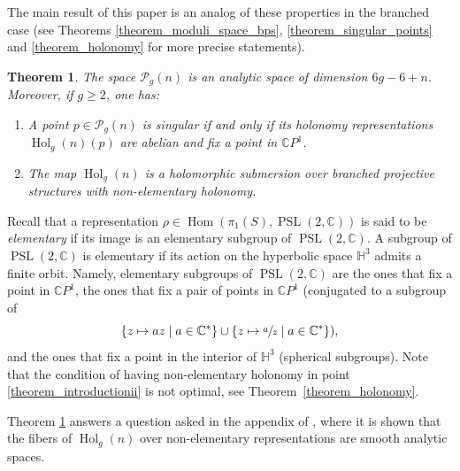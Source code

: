 \documentclass[10pt]{amsart}
\newcommand{\C}{\mathbb C}
\newcommand{\CP}{\mathbb CP}
\DeclareMathOperator{\Hol}{Hol}
\DeclareMathOperator{\Hom}{Hom}
\DeclareMathOperator{\PSL}{PSL}
\theoremstyle{definition}
\theoremstyle{plain}
\newtheorem{theoremx}{Theorem}
\begin{document}
The main result of this paper is an analog of these properties in the branched case (see Theorems \ref{theorem_moduli_space_bps}, \ref{theorem_singular_points} and \ref{theorem_holonomy} for more precise statements).

\begin{theoremx}\label{theorem_introduction}
The space $\mathcal P_g(n)$ is an analytic space of dimension $6g-6+n$.
Moreover, if $g \ge 2$, one has:
\begin{enumerate}
\item\label{theorem_introductioni}
A point $p \in \mathcal P_g(n)$ is singular if and only if its holonomy representations $\Hol_g(n)(p)$ are abelian and fix a point in $\CP^1$.
\item\label{theorem_introductionii}
The map $\Hol_g(n)$ is a holomorphic submersion over branched projective structures with non-elementary holonomy.
\end{enumerate}
\end{theoremx}

Recall that a representation $\rho \in \Hom(\pi_1(S), \PSL(2, \C))$ is said to be \emph{elementary} if its image is an elementary subgroup of $\PSL(2, \C)$.
A subgroup of $\PSL(2, \C)$ is elementary if its action on the hyperbolic space $\mathbb H^3$ admits a finite orbit.
Namely, elementary subgroups of $\PSL(2, \C)$ are the ones that fix a point in $\CP^1$, the ones that fix a pair of points in $\CP^1$ (conjugated to a subgroup of\vspace*{-3pt}
\[
\{z \mapsto az \mid a \in \C^*\} \cup \{z \mapsto \sfrac a z \mid a \in \C^*\}),
\]
and the ones that fix a point in the interior of $\mathbb H^3$ (spherical subgroups).
Note that the condition of having non-elementary holonomy in point \eqref{theorem_introductionii} is not optimal, see Theorem~\ref{theorem_holonomy}.

Theorem \ref{theorem_introduction} answers a question asked in the appendix of \cite{calsamiglia-deroin-francaviglia}, where it is shown that the fibers of $\Hol_g(n)$ over non-elementary representations are smooth analytic spaces.
\end{document}
